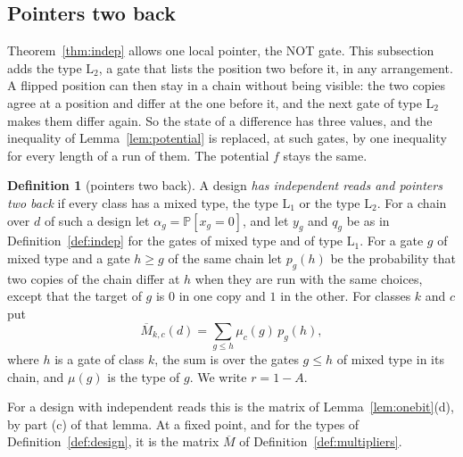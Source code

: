 \documentclass[11pt]{amsart}
\theoremstyle{definition}
\newtheorem{definition}[theorem]{Definition}
\theoremstyle{remark}
\newcommand{\PP}{\mathbb{P}}
\begin{document}
\subsection{Pointers two back}\label{sec:two}

Theorem~\ref{thm:indep} allows one local pointer, the NOT gate. This subsection adds the type
$\mathrm L_2$, a gate that lists the position two before it, in any arrangement. A flipped
position can then stay in a chain without being visible: the two copies agree at a position and
differ at the one before it, and the next gate of type $\mathrm L_2$ makes them differ again. So
the state of a difference has three values, and the inequality of Lemma~\ref{lem:potential} is
replaced, at such gates, by one inequality for every length of a run of them. The potential $f$
stays the same.

\begin{definition}[pointers two back]\label{def:two}
A design \emph{has independent reads and pointers two back} if every class has a mixed type, the
type $\mathrm L_1$ or the type $\mathrm L_2$. For a chain over $d$ of such a design let
$\alpha_g=\PP[x_g=0]$, and let $y_g$ and $q_g$ be as in Definition~\ref{def:indep} for the gates
of mixed type and of type $\mathrm L_1$. For a gate $g$ of mixed type and a gate $h\ge g$ of the
same chain let $p_g(h)$ be the probability that two copies of the chain differ at $h$ when they
are run with the same choices, except that the target of $g$ is $0$ in one copy and $1$ in the
other. For classes $k$ and $c$ put
\[
\overline M_{k,c}(d)=\sum_{g\le h}\mu_c(g)\,p_g(h),
\]
where $h$ is a gate of class $k$, the sum is over the gates $g\le h$ of mixed type in its chain,
and $\mu(g)$ is the type of $g$. We write $r=1-A$.
\end{definition}

\noindent For a design with independent reads this is the matrix of Lemma~\ref{lem:onebit}(d),
by part (c) of that lemma. At a fixed point, and for the types of Definition~\ref{def:design},
it is the matrix $\overline M$ of Definition~\ref{def:multipliers}.
\end{document}
